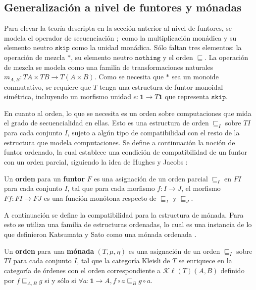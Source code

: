 \subsection{Generalización a nivel de funtores y mónadas}\label{mc:lifting}

Para elevar la teoría descripta en la sección anterior al nivel de funtores, se modela el operador de secuenciación $;$ como la multiplicación monádica y su elemento neutro $\mathtt{skip}$ como la unidad monádica. Sólo faltan tres elementos: la operación de mezcla $*$, su elemento neutro $\mathtt{nothing}$ y el orden $\sqsubseteq$. La operación de mezcla se modela como una familia de transformaciones naturales $m_{A,B} : \mathit{T} A \times \mathit{T} B \rightarrow \mathit{T} (A \times B)$. Como se necesita que $*$ sea un monoide conmutativo, se requiere que $\mathit{T}$ tenga una estructura de funtor monoidal simétrica, incluyendo un morfismo unidad $e : \mathbf{1} \rightarrow \mathit{T} \mathbf{1}$ que representa $\mathtt{skip}$. 

En cuanto al orden, lo que se necesita es un orden sobre computaciones que mida el grado de secuencialidad en ellas. Esto es una estructura de orden $\sqsubseteq_I$ sobre $\mathit{T} I$ para cada conjunto $I$, sujeto a algún tipo de compatibilidad con el resto de la estructura que modela computaciones. Se define a continuación la noción de funtor ordenado, la cual establece una condición de compatibilidad de un funtor con un orden parcial, siguiendo la idea de Hughes y Jacobs \cite{hughes:2004}:

\begin{definition}
Un \textbf{orden} para un \textbf{funtor} $\mathit{F}$ es una asignación de un orden parcial $\sqsubseteq_I$ en $\mathit{F} I$ para cada conjunto $I$, tal que para cada morfismo $f : I \rightarrow J$, el morfismo $\mathit{F} f : \mathit{F} I \rightarrow \mathit{F} J$ es una función monótona respecto de $\sqsubseteq_I$ y $\sqsubseteq_J$.
\end{definition}

A continuación se define la compatibilidad para la estructura de mónada. Para esto se utiliza una familia de estructuras ordenadas, lo cual es una instancia de lo que definieron Katsumata y Sato como una mónada ordenada \cite{katsumata:2013}.

\begin{definition}
Un \textbf{orden} para una \textbf{mónada} $(\mathit{T},\mu,\eta)$ es una asignación de un orden $\sqsubseteq_I$ sobre $\mathit{T} I$ para cada conjunto $I$, tal que la categoría Kleisli de $T$ se enriquece en la categoría de órdenes con el orden correspondiente a $\mathcal{K}\ell(\mathit{T})(A,B)$ definido por $f \sqsubseteq_{A,B} g$ si y sólo si $\forall a : \mathbf{1} \rightarrow A, f \circ a \sqsubseteq_B g \circ a$.
\end{definition}

